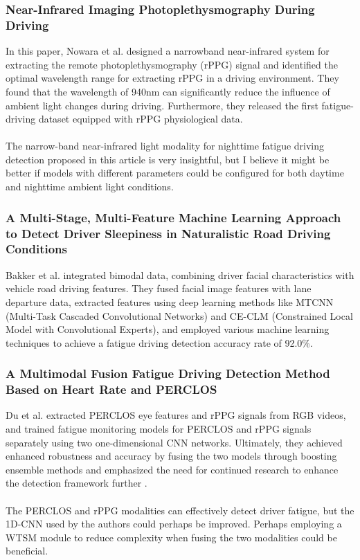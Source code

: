 \documentclass[a4paper]{article}
\begin{document}
\subsubsection{Near-Infrared Imaging Photoplethysmography During Driving}
In this paper, Nowara et al. designed a narrowband near-infrared system for extracting the remote photoplethysmography (rPPG) signal and identified the optimal wavelength range for extracting rPPG in a driving environment. They found that the wavelength of 940nm can significantly reduce the influence of ambient light changes during driving. Furthermore, they released the first fatigue-driving dataset equipped with rPPG physiological data\cite{nowara2020near}.\\
\\The narrow-band near-infrared light modality for nighttime fatigue driving detection proposed in this article is very insightful, but I believe it might be better if models with different parameters could be configured for both daytime and nighttime ambient light conditions.

\subsubsection{A Multi-Stage, Multi-Feature Machine Learning Approach to Detect Driver Sleepiness in Naturalistic Road Driving Conditions}
Bakker et al. integrated bimodal data, combining driver facial characteristics with vehicle road driving features. They fused facial image features with lane departure data, extracted features using deep learning methods like MTCNN (Multi-Task Cascaded Convolutional Networks) and CE-CLM (Constrained Local Model with Convolutional Experts), and employed various machine learning techniques to achieve a fatigue driving detection accuracy rate of 92.0\%\cite{bakker2021multi}.

\subsubsection{A Multimodal Fusion Fatigue Driving Detection Method Based on Heart Rate and PERCLOS}
Du et al. extracted PERCLOS eye features and rPPG signals from RGB videos, and trained fatigue monitoring models for PERCLOS and rPPG signals separately using two one-dimensional CNN networks. Ultimately, they achieved enhanced robustness and accuracy by fusing the two models through boosting ensemble methods and emphasized the need for continued research to enhance the detection framework further \cite{du2022multimodal}. \\
\\The PERCLOS and rPPG modalities can effectively detect driver fatigue, but the 1D-CNN used by the authors could perhaps be improved. Perhaps employing a WTSM module to reduce complexity when fusing the two modalities could be beneficial.
\end{document}
